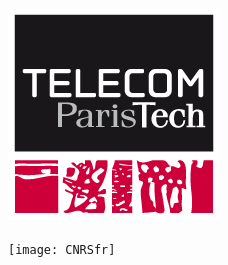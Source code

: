 \begin{titlepage}
\begin{center}
\begin{minipage}{0.8\textwidth}
\begin{center}
\end{center}

\end{minipage}%

\begin{figure}
\begin{subfigure}[b]{5cm}          
\includegraphics[scale=0.5, left]{Figures/TelecomParisTech}
\end{subfigure}
%
\hspace{6.5cm}
%
\begin{subfigure}[b]{5cm}
\texttt{[image: CNRSfr]}
\end{subfigure}
\end{figure}

\vfill
\end{center}
\end{titlepage}